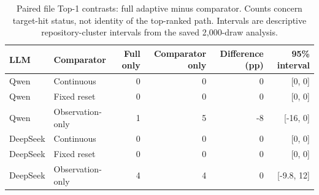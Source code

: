 \begin{table}[t]
\caption{Paired file Top-1 contrasts: full adaptive minus comparator. Counts concern target-hit status, not identity of the top-ranked path. Intervals are descriptive repository-cluster intervals from the saved 2,000-draw analysis.}\label{tab:paired}
\centering\small
\begin{tabular*}{\textwidth}{@{\extracolsep{\fill}}llrrrr@{}}\toprule
LLM & Comparator & Full only & Comparator only & Difference (pp) & 95\% interval\\\midrule
Qwen & Continuous & 0 & 0 & 0 & [0, 0]\\
Qwen & Fixed reset & 0 & 0 & 0 & [0, 0]\\
Qwen & Observation-only & 1 & 5 & -8 & [-16, 0]\\
DeepSeek & Continuous & 0 & 0 & 0 & [0, 0]\\
DeepSeek & Fixed reset & 0 & 0 & 0 & [0, 0]\\
DeepSeek & Observation-only & 4 & 4 & 0 & [-9.8, 12]\\
\bottomrule\end{tabular*}
\end{table}
